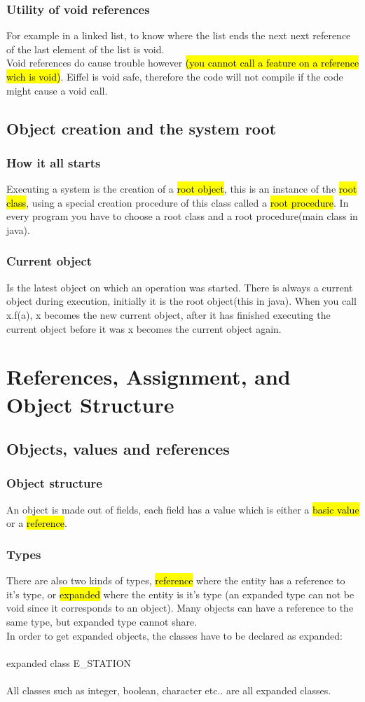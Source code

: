 \documentclass[11pt]{article}
\begin{document}
\subsubsection{Utility of void references}
For example in a linked list, to know where the list ends the next next reference of the last element of the list is void.\\ Void references do cause trouble however \hl{(you cannot call a feature on a reference wich is void)}. Eiffel is void safe, therefore the code will not compile if the code might cause a void call.
\subsection{Object creation and the system root}
\subsubsection{How it all starts}
Executing a system is the creation of a \hl{root object}, this is an instance of the \hl{root class}, using a special creation procedure of this class called a \hl{root procedure}. In every program you have to choose a root class and a root procedure(main class in java).
\subsubsection{Current object}
Is the latest object on which an operation was started. There is always a current object during execution, initially it is the root object(this in java). When you call x.f(a), x becomes the new current object, after it has finished executing the current object before it was x becomes the current object again.

\section{References, Assignment, and Object Structure}
\subsection{Objects, values and references}
\subsubsection{Object structure}
An object is made out of fields, each field has a value which is either a \hl{basic value} or a \hl{reference}.
\subsubsection{Types} There are also two kinds of types, \hl{reference} where the entity has a reference to it's type, or \hl{expanded} where the entity is it's type (an expanded type can not be void since it corresponds to an object). Many objects can have a reference to the same type, but expanded type cannot share.\\ In order to get expanded objects, the classes have to be declared as expanded:\\\\ expanded class E\_STATION\\\\All classes such as integer, boolean, character etc.. are all expanded classes.
\end{document}
